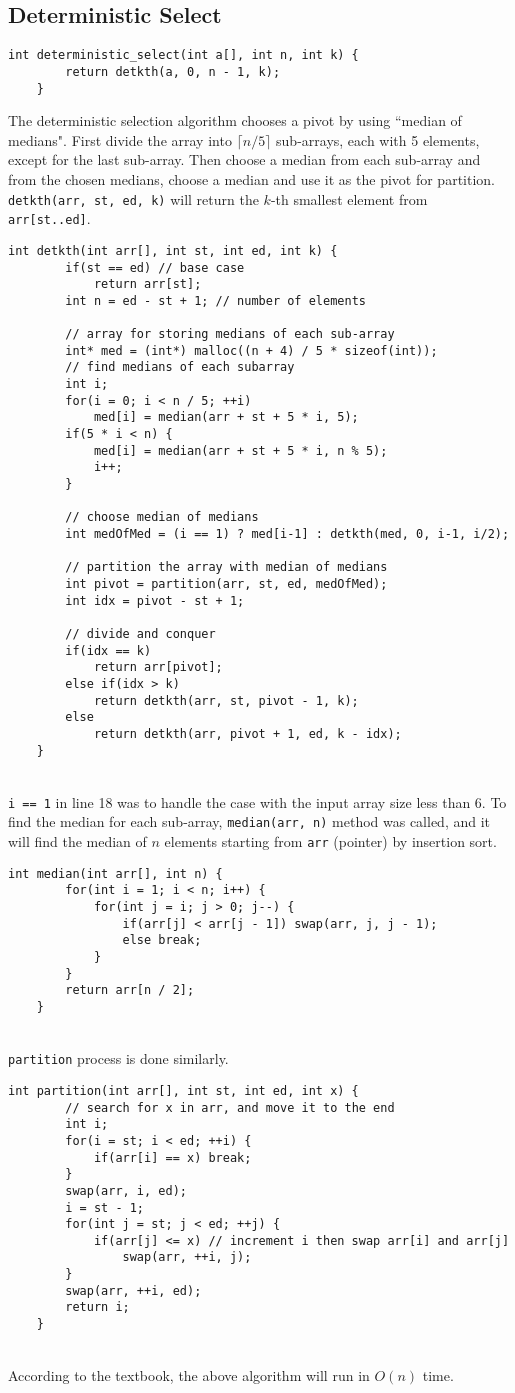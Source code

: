 \documentclass[12pt]{article}
\begin{document}
\subsection{Deterministic Select}
\begin{lstlisting}[style=Cstyle]
	int deterministic_select(int a[], int n, int k) {
		return detkth(a, 0, n - 1, k);
	}
\end{lstlisting}
The deterministic selection algorithm chooses a pivot by using ``median of medians". First divide the array into $\lceil n/5\rceil$ sub-arrays, each with 5 elements, except for the last sub-array. Then choose a median from each sub-array and from the chosen medians, choose a median and use it as the pivot for partition. \texttt{detkth(arr, st, ed, k)} will return the $k$-th smallest element from \texttt{arr[st..ed]}.
\begin{lstlisting}[style=Cstyle]
	int detkth(int arr[], int st, int ed, int k) {
	    if(st == ed) // base case
	    	return arr[st];
		int n = ed - st + 1; // number of elements
		
		// array for storing medians of each sub-array
		int* med = (int*) malloc((n + 4) / 5 * sizeof(int));
		// find medians of each subarray
		int i;
		for(i = 0; i < n / 5; ++i)
			med[i] = median(arr + st + 5 * i, 5);
		if(5 * i < n) {
			med[i] = median(arr + st + 5 * i, n % 5);
			i++;
		}
		
		// choose median of medians
		int medOfMed = (i == 1) ? med[i-1] : detkth(med, 0, i-1, i/2);
		
		// partition the array with median of medians
		int pivot = partition(arr, st, ed, medOfMed);
		int idx = pivot - st + 1;
		
		// divide and conquer
		if(idx == k)
			return arr[pivot];
		else if(idx > k)
			return detkth(arr, st, pivot - 1, k);
		else
			return detkth(arr, pivot + 1, ed, k - idx);
	}
\end{lstlisting}~\\
\texttt{i == 1} in line 18 was to handle the case with the input array size less than 6. To find the median for each sub-array, \texttt{median(arr, n)} method was called, and it will find the median of $n$ elements starting from \texttt{arr} (pointer) by insertion sort.
\begin{lstlisting}[style=Cstyle]
	int median(int arr[], int n) {
		for(int i = 1; i < n; i++) {
			for(int j = i; j > 0; j--) {
				if(arr[j] < arr[j - 1]) swap(arr, j, j - 1);    
				else break;
			}
		}
		return arr[n / 2];
	}
\end{lstlisting}~\\
\texttt{partition} process is done similarly.
\begin{lstlisting}[style=Cstyle]
	int partition(int arr[], int st, int ed, int x) {
		// search for x in arr, and move it to the end
		int i;
		for(i = st; i < ed; ++i) {
			if(arr[i] == x) break;
		}
		swap(arr, i, ed);
		i = st - 1;
		for(int j = st; j < ed; ++j) {
			if(arr[j] <= x) // increment i then swap arr[i] and arr[j]
				swap(arr, ++i, j);	
		}
		swap(arr, ++i, ed);
		return i;
	}
\end{lstlisting}~\\
According to the textbook, the above algorithm will run in $O(n)$ time.\\
\end{document}
